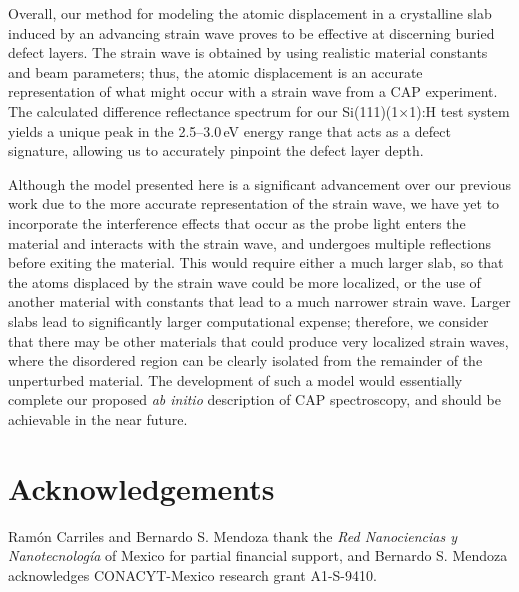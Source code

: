 \documentclass[aps,prb,10pt,showkeys,letterpaper,notitlepage,twocolumn]{revtex4-1}
\begin{document}
Overall, our method for modeling the atomic displacement in a crystalline slab
induced by an advancing strain wave proves to be effective at discerning buried
defect layers. The strain wave is obtained by using realistic material constants
and beam parameters; thus, the atomic displacement is an accurate representation
of what might occur with a strain wave from a CAP experiment. The calculated
difference reflectance spectrum for our Si(111)(1$\times$1):H test system yields
a unique  peak in the 2.5--3.0\,eV energy range that acts as a defect signature,
allowing us to accurately pinpoint the defect layer depth.

Although the model presented here is a significant advancement over our previous
work \cite{andersonPSSB18} due to the more accurate representation of the strain
wave, we have yet to incorporate the interference effects that occur as the
probe light enters the material and interacts with the strain wave, and
undergoes multiple reflections before exiting the material. This would require
either a much larger slab, so that the atoms displaced by the strain wave could
be more localized, or the use of another material with constants that lead to a
much narrower strain wave. Larger slabs lead to significantly larger
computational expense; therefore, we consider that there may be other materials
that could produce very localized strain waves, where the disordered region can
be clearly isolated from the remainder of the unperturbed material. The
development of such a model would essentially complete our proposed \emph{ab
initio} description of CAP spectroscopy, and should be achievable in the near
future.


\section{Acknowledgements}
Ram\'on Carriles and Bernardo S. Mendoza thank the \emph{Red Nanociencias y
Nanotecnolog\'ia} of Mexico for partial financial support, and Bernardo S.
Mendoza acknowledges CONACYT-Mexico research grant A1-S-9410.



\end{document}
